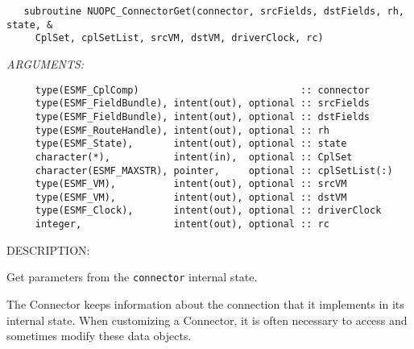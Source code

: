   
\begin{verbatim}   subroutine NUOPC_ConnectorGet(connector, srcFields, dstFields, rh, state, &
     CplSet, cplSetList, srcVM, dstVM, driverClock, rc)\end{verbatim}{\em ARGUMENTS:}
\begin{verbatim}     type(ESMF_CplComp)                            :: connector
     type(ESMF_FieldBundle), intent(out), optional :: srcFields
     type(ESMF_FieldBundle), intent(out), optional :: dstFields
     type(ESMF_RouteHandle), intent(out), optional :: rh
     type(ESMF_State),       intent(out), optional :: state
     character(*),           intent(in),  optional :: CplSet
     character(ESMF_MAXSTR), pointer,     optional :: cplSetList(:)
     type(ESMF_VM),          intent(out), optional :: srcVM
     type(ESMF_VM),          intent(out), optional :: dstVM
     type(ESMF_Clock),       intent(out), optional :: driverClock
     integer,                intent(out), optional :: rc\end{verbatim}
{\sf DESCRIPTION:\\ }


     Get parameters from the {\tt connector} internal state.
  
     The Connector keeps information about the connection that it implements 
     in its internal state. When customizing a Connector, it is often necessary
     to access and sometimes modify these data objects.
  
